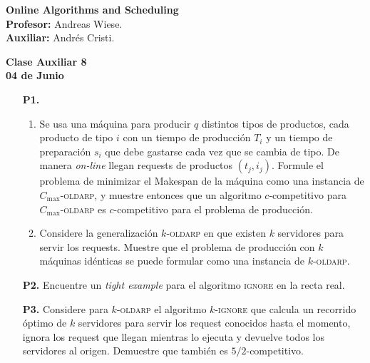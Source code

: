 \documentclass[11pt, spanish]{article}
\theoremstyle{plain}
\begin{document}

\begin{flushleft}
  \textbf{Online Algorithms and Scheduling}
  \\\textbf{Profesor:} Andreas Wiese.
  \\\textbf{Auxiliar:} Andrés Cristi.
\end{flushleft}


\begin{center}
  \large{\textbf{Clase Auxiliar 8\\ 04 de Junio}}
\end{center}




\begin{itemize}
	\item[\textbf{P1.}] 
	\begin{enumerate}
	    \item Se usa una máquina para producir $q$
    	distintos tipos de productos, cada producto de
    	tipo $i$ con un tiempo
    	de producción $T_i$ y un tiempo de preparación $s_i$
    	que debe gastarse cada vez que se cambia de tipo.
    	De manera \textit{on-line} llegan requests de productos
    	$(t_j,i_j)$. Formule el problema de minimizar
    	el Makespan de la máquina como una instancia de
    	$C_{\max}$-\textsc{oldarp}, y muestre entonces
    	que un algoritmo $c$-competitivo para $C_{\max}$-\textsc{oldarp} es $c$-competitivo
    	para el problema de producción.
	    \item Considere la generalización
	    $k$-\textsc{oldarp} en que existen $k$ servidores
	    para servir los requests. Muestre que el problema
	    de producción con $k$ máquinas idénticas se puede
	    formular como una instancia de $k$-\textsc{oldarp}.
	\end{enumerate}
	
	\item[\textbf{P2.}] Encuentre un \textit{tight example}
	para el algoritmo \textsc{ignore} en la recta real.

      \item[\textbf{P3.}]  Considere para $k$-\textsc{oldarp}
	el algoritmo $k$-\textsc{ignore} que calcula un
	recorrido óptimo de $k$ servidores
	para servir los request conocidos hasta el momento,
	ignora los request que llegan mientras lo ejecuta
	y devuelve todos los servidores al origen.
	Demuestre que también es $5/2$-competitivo.

	
    
    
\end{itemize}
\end{document}
